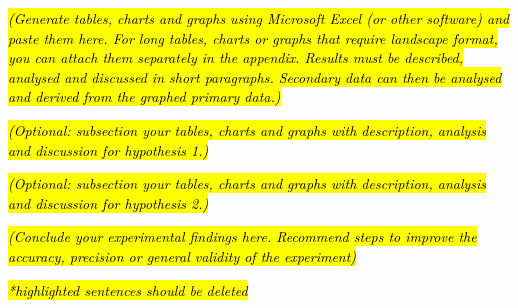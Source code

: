 \documentclass{Laboratory-Report}
\begin{document}
{\fontsize{10}{13.2}\selectfont\itshape\RaggedRight
\hl{(Generate tables, charts and graphs using Microsoft Excel (or other software) and paste them here. For long tables, charts or graphs that require landscape format, you can attach them separately in the appendix. Results must be described, analysed and discussed in short paragraphs. Secondary data can then be analysed and derived from the graphed primary data.)}\par} %

{\fontsize{10}{13.2}\selectfont\itshape\RaggedRight
\hl{(Optional: subsection your tables, charts and graphs with description, analysis and discussion for hypothesis 1.)}\par} %

{\fontsize{10}{13.2}\selectfont\itshape\RaggedRight
\hl{(Optional: subsection your tables, charts and graphs with description, analysis and discussion for hypothesis 2.)}\par} %


\ReportConclusions

{\fontsize{10}{13.2}\selectfont\itshape\RaggedRight
\hl{(Conclude your experimental findings here. Recommend steps to improve the accuracy, precision or general validity of the experiment)}\par} %







\par\addvspace{\ReportModuleSpacing}
{\fontsize{10}{13.2}\selectfont\itshape\RaggedRight
\hl{*highlighted sentences should be deleted}\par} %


\MakeMarkingRubric
\end{document}

